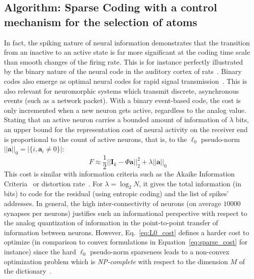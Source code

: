 \documentclass[a4paper, 11pt, draft]{article} %
\newcommand{\coef}{\mathbf{a}} %
\newcommand{\image}{\mathbf{I}} %
\newcommand{\dico}{\Phi} %
\newcommand{\enscond}[2]{\lbrace #1, #2 \rbrace}
\newcommand{\norm}[1]{|\!| #1 |\!|}
\newcommand{\abs}[1]{\left|#1\right|}
\newcommand{\seeEq}[1]{Eq.~\ref{eq:#1}}%
\begin{document}
\subsection{Algorithm: Sparse Coding with a control mechanism for the selection of atoms}
In fact, the spiking nature of neural information demonstrates that the transition from an inactive to an active state is far more significant at the coding time scale than smooth changes of the firing rate.
This is for instance perfectly illustrated by the binary nature of the neural code in the auditory cortex of rats~\citep{DeWeese03}. Binary codes also emerge as optimal neural codes for rapid signal transmission~\citep{Bethge03}. This is also relevant for neuromorphic systems which transmit discrete, asynchronous events (such as a network packet). With a binary event-based code, the cost is only incremented when a new neuron gets active, regardless to the analog value. Stating that an active neuron carries a bounded amount of information of $\lambda$ bits, an upper bound for the representation cost of neural activity on the receiver end is proportional to the count of active neurons, that is, to the $\ell_0$ pseudo-norm $\norm{\coef}_0 = \abs{\enscond{i}{\coef_i \neq 0}}$:%
\begin{equation}%
F \approx  \frac{1}{2} \norm{\image_k - \dico \coef}_2^2 + \lambda\norm{\coef}_0%
\label{eq:L0_cost}%
\end{equation}%
This cost is similar with information criteria such as the Akaike Information Criteria~\citep{Akaike74} or distortion rate~\citep[p.~571]{Mallat98}. For $\lambda=\log_2 N$, it gives the total information (in bits) to code for the residual (using entropic coding) and the list of spikes' addresses. In general, the high inter-connectivity of neurons (on average $10000$ synapses per neurons) justifies such an informational perspective with respect to the analog quantization of information in the point-to-point transfer of information between neurons.
However, \seeEq{L0_cost} defines a harder cost to optimize (in comparison to convex formulations in Equation~\ref{eq:sparse_cost} for instance) since the hard $\ell_0$ pseudo-norm sparseness leads to a non-convex optimization problem which is \emph{NP-complete} with respect to the dimension $M$ of the dictionary~\citep[p.~418]{Mallat98}.
\end{document}

